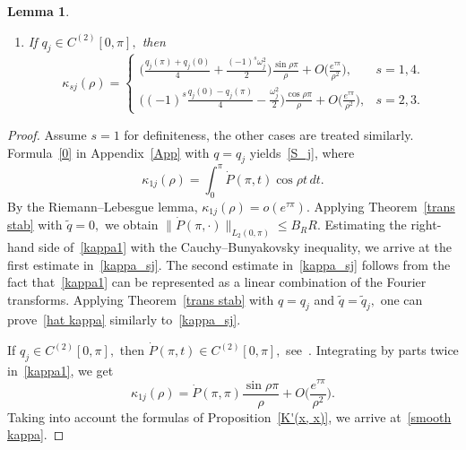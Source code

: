\documentclass[a4paper, 12pt] {article}
\theoremstyle{plain}
\newtheorem{lemma}{\indent Lemma}
\theoremstyle{remark}
\theoremstyle{plain}
\theoremstyle{definition}
\numberwithin{equation}{section}
\begin{document}
\begin{lemma}
\begin{enumerate}
\begin{equation} \label{hat kappa} 
|\hat\kappa_{sj}(\rho)| \le A_R \|\hat q_j \|_{L_2(0,\pi)} e^{\tau \pi}, \quad 
\|\hat \kappa_{sj}(\rho)\|_{L_2(\mathbb R + i \tau)} \le A_R \|\hat q_j \|_{L_2(0,\pi)} e^{\tau \pi}.
\end{equation}
\item
If $q_j\in C^{(2)}[0, \pi],$ then
\begin{equation}\label{smooth kappa}
\kappa_{sj}(\rho) = \left\{
\begin{array}{cc}
\displaystyle\Big(\frac{q_j(\pi) + q_j(0)}{4} + \frac{(-1)^s \omega_j^2}{2}\Big) \frac{\sin \rho \pi}{\rho} + O\Big(\frac{e^{\tau \pi}}{\rho^2}\Big), & s=1, 4.\\[3mm]
\displaystyle\Big((-1)^s\frac{q_j(0) - q_j(\pi)}{4} -\frac{ \omega_j^2}{2}\Big) \frac{\cos \rho \pi}{\rho} + O\Big(\frac{e^{\tau \pi}}{\rho^2}\Big), & s=2, 3.
\end{array}\right.
\end{equation}
\end{enumerate}
\end{lemma}
\begin{proof}
Assume $s=1$ for definiteness, the other cases are treated similarly. Formu\-la~\eqref{0}  in Appendix~\ref{App} with $q=q_j$ yields~\eqref{S_j}, where
\begin{equation} \label{kappa1}
\kappa_{1j}(\rho) = \int_0^\pi \dot P(\pi, t) \cos \rho t\, dt.
\end{equation}
By the Riemann--Lebesgue lemma, $\kappa_{1j}(\rho) = o(e^{\tau \pi}).$
Applying Theorem~\ref{trans stab} with $\tilde q = 0,$ we obtain $\| \dot P(\pi, \cdot)\|_{L_2(0, \pi)} \le B_R R.$ Estimating the right-hand side of~\eqref{kappa1} with the Cauchy--Bunyakovsky inequality, we arrive at the first estimate in~\eqref{kappa_sj}. The second estimate in~\eqref{kappa_sj} follows from the fact that~\eqref{kappa1} can be represented as a linear combination of the Fourier transforms.
Applying Theorem~\ref{trans stab} with $q=q_j$ and $\tilde q = \tilde q_j,$ one can prove~\eqref{hat kappa} similarly to~\eqref{kappa_sj}.

If $q_j\in C^{(2)}[0, \pi],$ then $ \dot P(\pi, t) \in C^{(2)}[0, \pi],$  see~\cite{march, freil}. Integrating by parts twice in~\eqref{kappa1}, we get
$$\kappa_{1j}(\rho) = \dot P(\pi, \pi)\frac{\sin \rho \pi}{\rho} + O\Big(\frac{ e^{\tau \pi}}{\rho^2}\Big).$$ Taking into account the formulas of Proposition~\ref{K'(x, x)}, we arrive at~\eqref{smooth kappa}.
\end{proof}
\end{document}
